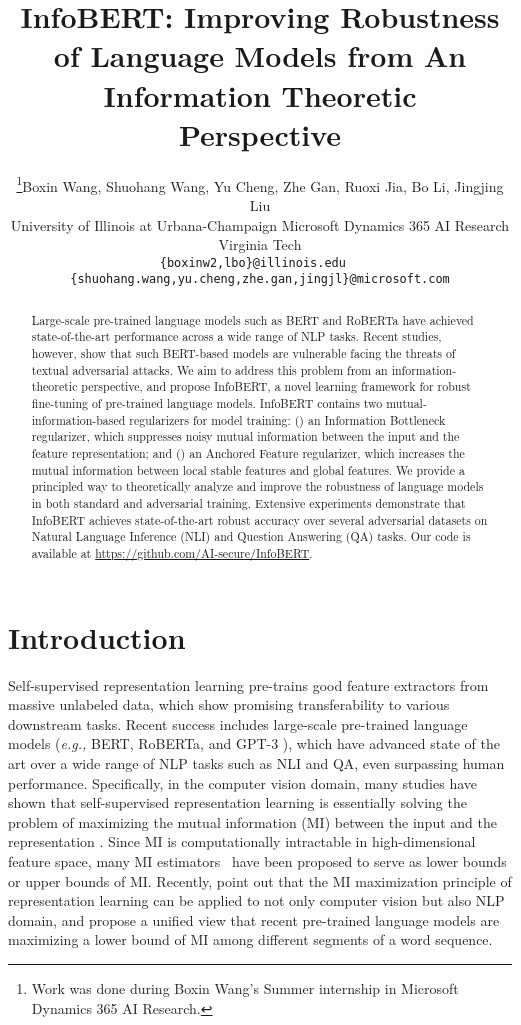\documentclass{article} \usepackage{iclr2021_conference,times}
\title{InfoBERT: Improving Robustness of Language Models from An Information Theoretic \\ Perspective}
\author{\thanks{Work was done during Boxin Wang's Summer internship in Microsoft Dynamics 365 AI Research.}Boxin Wang, Shuohang Wang, Yu Cheng, Zhe Gan, Ruoxi Jia, Bo Li, Jingjing Liu \\
\small University of Illinois at Urbana-Champaign \;  Microsoft Dynamics 365 AI Research \;  Virginia Tech \\
\scriptsize \texttt{\{boxinw2,lbo\}@illinois.edu \, \{shuohang.wang,yu.cheng,zhe.gan,jingjl\}@microsoft.com}}
\theoremstyle{definition}
\theoremstyle{remark}
\begin{document}
\maketitle

\begin{abstract}
Large-scale pre-trained language models such as BERT and RoBERTa have achieved state-of-the-art performance across a wide range of NLP tasks. Recent studies, however, show that such BERT-based models are vulnerable facing the threats of textual adversarial attacks. We aim to address this problem from an information-theoretic perspective, and propose InfoBERT, a novel learning framework for robust fine-tuning of pre-trained language models. InfoBERT contains two mutual-information-based regularizers for model training: () an Information Bottleneck regularizer, which suppresses noisy mutual information between the input and the feature representation; and () an Anchored Feature regularizer, which increases the mutual information between local stable features and global features.
We provide a principled way to theoretically analyze and improve the robustness of language models in both standard and adversarial training. Extensive experiments demonstrate that InfoBERT 
achieves state-of-the-art robust accuracy over several adversarial datasets on Natural Language Inference (NLI) and Question Answering (QA) tasks. 
Our code is available at \url{https://github.com/AI-secure/InfoBERT}.
    
\end{abstract} 
\section{Introduction}


Self-supervised representation learning pre-trains good feature extractors from massive unlabeled data, which show promising transferability to various downstream tasks.
Recent success includes large-scale pre-trained language models (\emph{e.g.,} BERT, RoBERTa, and GPT-3 \citep{bert,roberta,gpt3}), which have advanced state of the art over a wide range of NLP tasks such as NLI and QA, even surpassing human performance. Specifically, in the computer vision domain, many studies have shown that self-supervised representation learning is essentially solving the problem of maximizing the mutual information (MI)  between the input  and the representation  \citep{infonce, pmlr-v80-belghazi18a,hjelm2018learning,simclr}. Since MI is computationally intractable in high-dimensional feature space, many MI estimators~\citep{pmlr-v80-belghazi18a} have been proposed to serve as lower bounds \citep{Barber2003TheIA,infonce} or upper bounds \citep{Cheng2020CLUBAC} of MI.  Recently, \citeauthor{Kong2020A} 
point out that the MI maximization principle of representation learning can be applied to not only computer vision but also NLP domain, and propose a unified view that recent pre-trained language models are maximizing a lower bound of MI among different segments of a word sequence. 
\end{document}
